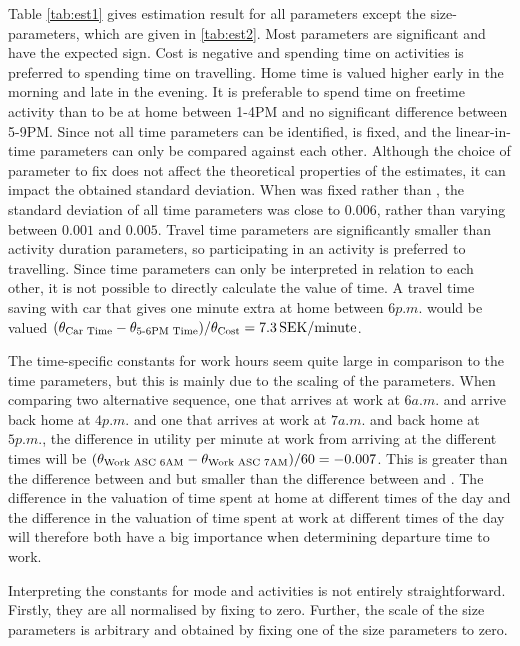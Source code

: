 Table \ref{tab:est1} gives estimation result for all parameters except the size-parameters, which are given in \ref{tab:est2}. Most parameters are significant and have the expected sign. Cost is negative and spending time on activities is preferred to spending time on travelling. Home time is valued higher early in the morning and late in the evening. It is preferable to spend time on freetime activity than to be at home between 1-4PM and no significant difference between 5-9PM. Since not all time parameters can be identified,  is fixed, and the linear-in-time parameters can only be compared against each other. Although the choice of parameter to fix does not affect the theoretical properties of the estimates, it can impact the obtained standard deviation. When  was fixed rather than , the standard deviation of all time parameters was close to $0.006$, rather than varying between $0.001$ and $0.005$. Travel time parameters are significantly smaller than activity duration parameters, so participating in an activity is preferred to travelling. Since time parameters can only be interpreted in relation to each other, it is not possible to directly calculate the value of time. A travel time saving with car that gives one minute extra at home between $6\unit{p.m.}$ would be valued $({\theta_{\text{Car Time}}} - {\theta_{\text{5-6PM Time}}})/{\theta_{\text{Cost}}} = 7.3\, \mathrm{SEK/minute}$.

The time-specific constants for work hours seem quite large in comparison to the time parameters, but this is mainly due to the scaling of the parameters. When comparing two alternative sequence, one that arrives at work at $6\unit{a.m.}$ and arrive back home at $4\unit{p.m.}$ and one that arrives at work at $7\unit{a.m.}$ and back home at $5\unit{p.m.}$, the difference in utility per minute at work from arriving at the different times will be $({\theta_{\text{Work ASC 6AM}}}-{\theta_{\text{Work ASC 7AM}}})/60 = -0.007$. This is greater than the difference between  and  but smaller than the difference between  and . The difference in the valuation of time spent at home at different times of the day and the difference in the valuation of time spent at work at different times of the day will therefore both have a big importance when determining departure time to work.

Interpreting the constants for mode and activities is not entirely straightforward. Firstly, they are all normalised by fixing  to zero. Further, the scale of the size parameters is arbitrary and obtained by fixing one of the size parameters to zero. 

